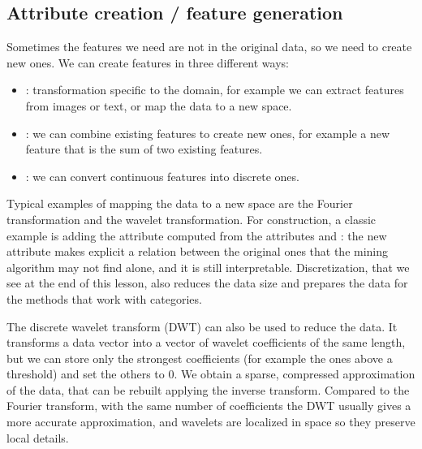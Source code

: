 \subsection{Attribute creation / feature generation}
Sometimes the features we need are not in the original data, so we need to create new ones. We can create features in three different ways:
\begin{itemize}
    \item {}: transformation specific to the domain, for example we can extract features from images or text, or map the data to a new space.
    \item {}: we can combine existing features to create new ones, for example a new feature that is the sum of two existing features.
    \item {}: we can convert continuous features into discrete ones.
\end{itemize}

Typical examples of mapping the data to a new space are the Fourier transformation and the wavelet transformation. For construction, a classic example is adding the attribute  computed from the attributes  and : the new attribute makes explicit a relation between the original ones that the mining algorithm may not find alone, and it is still interpretable. Discretization, that we see at the end of this lesson, also reduces the data size and prepares the data for the methods that work with categories.

\begin{remark}
The discrete wavelet transform (DWT) can also be used to reduce the data. It transforms a data vector into a vector of wavelet coefficients of the same length, but we can store only the strongest coefficients (for example the ones above a threshold) and set the others to 0. We obtain a sparse, compressed approximation of the data, that can be rebuilt applying the inverse transform. Compared to the Fourier transform, with the same number of coefficients the DWT usually gives a more accurate approximation, and wavelets are localized in space so they preserve local details.
\end{remark}

